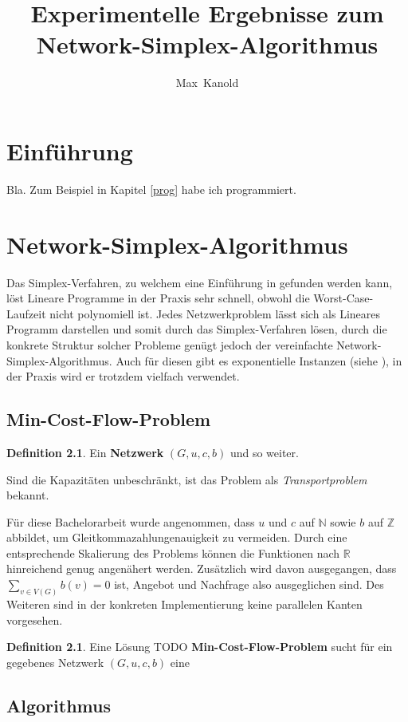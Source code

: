 \documentclass[a4paper,twoside]{report}
\author{Max~Kanold}
\title{Experimentelle Ergebnisse zum Network-Simplex-Algorithmus}
\theoremstyle{plain}
\theoremstyle{definition}
\newtheorem{defn}[thm]{Definition}
\begin{document}
\maketitle
\tableofcontents

\newpage
\chapter{Einführung}
Bla. Zum Beispiel in Kapitel \ref{prog} habe ich programmiert.

\newpage
\chapter{Network-Simplex-Algorithmus}
Das Simplex-Verfahren, zu welchem eine Einführung in \cite{NSAbook} gefunden werden kann, löst Lineare Programme in der Praxis sehr schnell, obwohl die Worst-Case-Laufzeit nicht polynomiell ist. Jedes Netzwerkproblem lässt sich als Lineares Programm darstellen und somit durch das Simplex-Verfahren lösen, durch die konkrete Struktur solcher Probleme genügt jedoch der vereinfachte Network-Simplex-Algorithmus. Auch für diesen gibt es exponentielle Instanzen (siehe \cite{Exponential}), in der Praxis wird er trotzdem vielfach verwendet.

\section{Min-Cost-Flow-Problem}
\begin{defn}Ein \textbf{Netzwerk} $(G,u,c,b)$ und so weiter.\end{defn}
Sind die Kapazitäten unbeschränkt, ist das Problem als \emph{Transportproblem} bekannt.

Für diese Bachelorarbeit wurde angenommen, dass $u$ und $c$ auf $\mathbb{N}$ sowie $b$ auf $\mathbb{Z}$ abbildet, um Gleitkommazahlungenauigkeit zu vermeiden. Durch eine entsprechende Skalierung des Problems können die Funktionen nach $\mathbb{R}$ hinreichend genug angenähert werden. Zusätzlich wird davon ausgegangen, dass $\sum_{v\in V(G)} b(v) = 0$ ist, Angebot und Nachfrage also ausgeglichen sind. Des Weiteren sind in der konkreten Implementierung keine parallelen Kanten vorgesehen.

\begin{defn}Eine Lösung TODO \textbf{Min-Cost-Flow-Problem} sucht für ein gegebenes Netzwerk $(G,u,c,b)$ eine \end{defn}


\section{Algorithmus}
\end{document}
